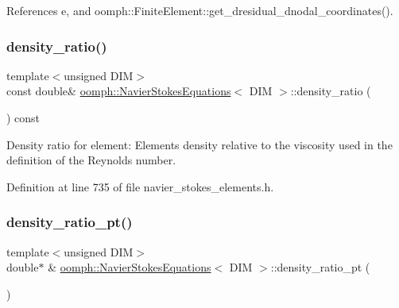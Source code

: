 References e, and oomph\+::\+Finite\+Element\+::get\+\_\+dresidual\+\_\+dnodal\+\_\+coordinates().

\mbox{\label{classoomph_1_1NavierStokesEquations_ae1fe9129b87052e804a3e204ed62a6c2}} 
\subsubsection{\texorpdfstring{density\+\_\+ratio()}{density\_ratio()}}
{\footnotesize\ttfamily template$<$unsigned D\+IM$>$ \\
const double\& \hyperlink{classoomph_1_1NavierStokesEquations}{oomph\+::\+Navier\+Stokes\+Equations}$<$ D\+IM $>$\+::density\+\_\+ratio (\begin{DoxyParamCaption}{ }\end{DoxyParamCaption}) const\hspace{0.3cm}{\ttfamily [inline]}}



Density ratio for element\+: Element\textquotesingle{}s density relative to the viscosity used in the definition of the Reynolds number. 



Definition at line 735 of file navier\+\_\+stokes\+\_\+elements.\+h.

\mbox{\label{classoomph_1_1NavierStokesEquations_a74ed476b9cae298f55e56a2a6a970b02}} 
\subsubsection{\texorpdfstring{density\+\_\+ratio\+\_\+pt()}{density\_ratio\_pt()}}
{\footnotesize\ttfamily template$<$unsigned D\+IM$>$ \\
double$\ast$ \& \hyperlink{classoomph_1_1NavierStokesEquations}{oomph\+::\+Navier\+Stokes\+Equations}$<$ D\+IM $>$\+::density\+\_\+ratio\+\_\+pt (\begin{DoxyParamCaption}{ }\end{DoxyParamCaption})\hspace{0.3cm}{\ttfamily [inline]}}



